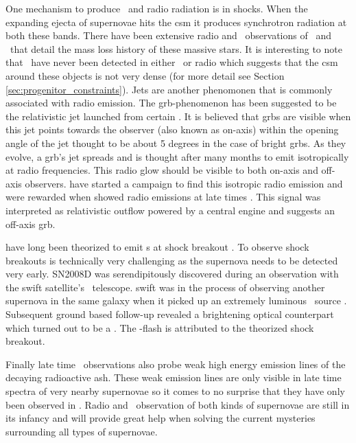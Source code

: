 One mechanism to produce \xray\ and radio radiation is in shocks. When the expanding ejecta of supernovae hits the \gls{csm}   it produces synchrotron radiation at both these bands. There have been extensive radio and \xray\ observations of \sneii\ and \sneibc\ that detail the mass loss history of these massive stars. It is interesting to note that \sneia\ have never been detected in either \xray\ or radio which suggests that the \gls{csm} around these objects is not very dense (for more detail see Section \ref{sec:progenitor_constraints}). Jets are another phenomonen that is commonly associated with radio emission. The \gls{grb}-phenomenon has been suggested to be the relativistic jet launched from certain \snibc. It is believed that \glspl{grb} are visible when this jet points towards the observer (also known as on-axis) within the opening angle of the jet thought to be about 5 degrees in the case of bright \glspl{grb}. As they evolve, a \gls{grb}'s jet spreads and is thought after many months to emit isotropically at radio frequencies. This radio glow should be visible to both on-axis and off-axis observers. \cite{2006ApJ...638..930S} have started a campaign to find this isotropic radio emission and were rewarded when  showed radio emissions at late times  \citep{2010Natur.463..513S}. This signal was interpreted as relativistic outflow powered by a central engine and suggests an off-axis \gls{grb}.

\sneiiibc have long been theorized to emit \xray s at shock breakout \citep{1978ApJ...223L.109K,1974ApJ...187..333C}. To observe shock breakouts is technically very challenging as the supernova needs to be detected very early. SN2008D was serendipitously discovered during an observation with the \gls{swift} satellite's \xray\ telescope. \gls{swift} was in the process of observing another supernova  in the same galaxy when it picked up an extremely luminous \xray\ source \cite{2008Natur.453..469S}. Subsequent ground based follow-up revealed a brightening optical counterpart which turned out to be a \snibc. The \xray-flash is attributed to the theorized shock breakout.

Finally late time \xray\ observations also probe weak high energy emission lines of the decaying radioactive ash. These weak emission lines are only visible in late time spectra of very nearby supernovae so it comes to no surprise that they have only been observed in  \citep{1987Natur.330..230S, 1987Natur.330..230D}. Radio and \xray\ observation of both kinds of supernovae are still in its infancy and will provide great help when solving the current mysteries surrounding all types of supernovae.

